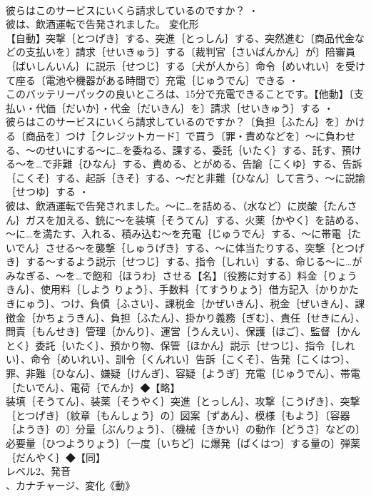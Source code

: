 \documentclass[8pt]{extreport}
\begin{document}
\begin{CJK}{UTF8}{min}
\\	彼らはこのサービスにいくら請求しているのですか？ ・
\\	彼は、飲酒運転で告発されました。	変化形 
\\	【自動】突撃｛とつげき｝する、突進｛とっしん｝する、突然進む〔商品代金などの支払いを〕請求｛せいきゅう｝する〔裁判官｛さいばんかん｝が〕陪審員｛ばいしんいん｝に説示｛せつじ｝する〔犬が人から〕命令｛めいれい｝を受けて座る〔電池や機器がある時間で〕充電｛じゅうでん｝できる ・
\\	このバッテリーパックの良いところは、15分で充電できることです。【他動】〔支払い・代価｛だいか｝・代金｛だいきん｝を〕請求｛せいきゅう｝する ・
\\	彼らはこのサービスにいくら請求しているのですか？〔負担｛ふたん｝を〕かける〔商品を〕つけ［クレジットカード］で買う〔罪・責めなどを〕～に負わせる、～のせいにする～に…を委ねる、課する、委託｛いたく｝する、託す、預ける～を…で非難｛ひなん｝する、責める、とがめる、告諭｛こくゆ｝する、告訴｛こくそ｝する、起訴｛きそ｝する、～だと非難｛ひなん｝して言う、～に説諭｛せつゆ｝する ・
\\	彼は、飲酒運転で告発されました。～に…を詰める、（水など）に炭酸｛たんさん｝ガスを加える、銃に～を装填｛そうてん｝する、火薬｛かやく｝を詰める、～に…を満たす、入れる、積み込む～を充電｛じゅうでん｝する、～に帯電｛たいでん｝させる～を襲撃｛しゅうげき｝する、～に体当たりする、突撃｛とつげき｝する～するよう説示｛せつじ｝する、指令｛しれい｝する、命じる～に…がみなぎる、～を…で飽和｛ほうわ｝させる【名】〔役務に対する〕料金｛りょうきん｝、使用料｛しよう りょう｝、手数料｛てすうりょう｝借方記入｛かりかた きにゅう｝、つけ、負債｛ふさい｝、課税金｛かぜいきん｝、税金｛ぜいきん｝、課徴金｛かちょうきん｝、負担｛ふたん｝、掛かり義務｛ぎむ｝、責任｛せきにん｝、問責｛もんせき｝管理｛かんり｝、運営｛うんえい｝、保護｛ほご｝、監督｛かんとく｝委託｛いたく｝、預かり物、保管｛ほかん｝説示｛せつじ｝、指令｛しれい｝、命令｛めいれい｝、訓令｛くんれい｝告訴｛こくそ｝、告発｛こくはつ｝、罪、非難｛ひなん｝、嫌疑｛けんぎ｝、容疑｛ようぎ｝充電｛じゅうでん｝、帯電｛たいでん｝、電荷｛でんか｝◆【略】
\\	装填｛そうてん｝、装薬｛そうやく｝突進｛とっしん｝、攻撃｛こうげき｝、突撃｛とつげき｝〔紋章｛もんしょう｝の〕図案｛ずあん｝、模様｛もよう｝〔容器｛ようき｝の〕分量｛ぶんりょう｝、〔機械｛きかい｝の動作｛どうさ｝などの〕必要量｛ひつようりょう｝〔一度｛いちど｝に爆発｛ばくはつ｝する量の〕弾薬｛だんやく｝◆【同】
\\	レベル2、発音
\\	、カナチャージ、変化《動》

\end{CJK}
\end{document}
